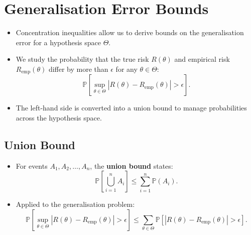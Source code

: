 




\section{Generalisation Error Bounds}


\begin{itemize}
    \item Concentration inequalities allow us to derive bounds on the generalisation error for a hypothesis space $\Theta$.
    \item We study the probability that the true risk $R(\theta)$ and empirical risk $R_{\text{emp}}(\theta)$ differ by more than $\epsilon$ for any $\theta \in \Theta$:
          \[
              \mathbb{P} \left[ \sup_{\theta \in \Theta} |R(\theta) - R_{\text{emp}}(\theta)| > \epsilon \right].
          \]
    \item The left-hand side is converted into a union bound to manage probabilities across the hypothesis space.
\end{itemize}

\subsection{Union Bound}

\begin{itemize}
    \item For events $A_1, A_2, \dots, A_n$, the \textbf{union bound} states:
          \[
              \mathbb{P} \left[ \bigcup_{i=1}^n A_i \right] \leq \sum_{i=1}^n \mathbb{P}(A_i).
          \]
    \item Applied to the generalisation problem:
          \[
              \mathbb{P} \left[ \sup_{\theta \in \Theta} |R(\theta) - R_{\text{emp}}(\theta)| > \epsilon \right]
              \leq \sum_{\theta \in \Theta} \mathbb{P} \left[ |R(\theta) - R_{\text{emp}}(\theta)| > \epsilon \right].
          \]
\end{itemize}

